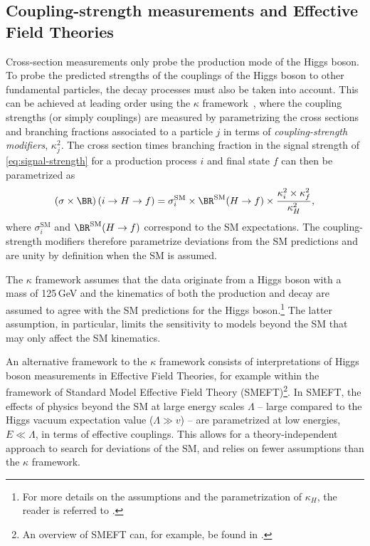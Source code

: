 \subsection{Coupling-strength measurements and Effective Field Theories}
\label{subsec:coupling-measurements}
Cross-section measurements only probe the production mode of the Higgs boson.
To probe the predicted strengths of the couplings of the Higgs boson to other fundamental particles, the decay processes must also be taken into account.
This can be achieved at leading order using the $\kappa$ framework~\cite{LHCHandbookV3}, where the coupling strengths (or simply couplings) are measured by parametrizing the cross sections and branching fractions associated to a particle $j$ in terms of \emph{coupling-strength modifiers}, $\kappa_j^2$.
The cross section times branching fraction in the signal strength of \cref{eq:signal-strength} for a production process $i$ and final state $f$ can then be parametrized as
\begin{equation}
  \label{eq:kappa-parametrization}
  \left( \sigma \times  \BR \right) (i \to H \to f)  =  \sigma_{i}^\mathrm{SM} \times \BR^\mathrm{SM}(H \to f) \times \frac{\kappa_i^2 \times  \kappa_f^2}{\kappa_H^2}, 
\end{equation}
where $\sigma_{i}^\mathrm{SM}$ and $\BR^\mathrm{SM}(H \to f)$ correspond to the SM expectations. 
The coupling-strength modifiers therefore parametrize deviations from the SM predictions and are unity by definition when the SM is assumed.

The $\kappa$ framework assumes that the data originate from a Higgs boson with a mass of 125\,GeV and the kinematics of both the production and decay are assumed to agree with the SM predictions for the Higgs boson.\footnote{For more details on the assumptions and the parametrization of $\kappa_H$, the reader is referred to .}
The latter assumption, in particular, limits the sensitivity to models beyond the SM that may only affect the SM kinematics. 

An alternative framework to the $\kappa$ framework consists of interpretations of Higgs boson measurements in Effective Field Theories, for example within the framework of Standard Model Effective Field Theory (SMEFT)\footnote{An overview of SMEFT can, for example, be found in .}.
In SMEFT, the effects of physics beyond the SM at large energy scales $\Lambda$ -- large compared to the Higgs vacuum expectation value ($\Lambda \gg v$) -- are parametrized at low energies, $E \ll \Lambda$, in terms of effective couplings. 
This allows for a theory-independent approach to search for deviations of the SM, and relies on fewer assumptions than the $\kappa$ framework. 

